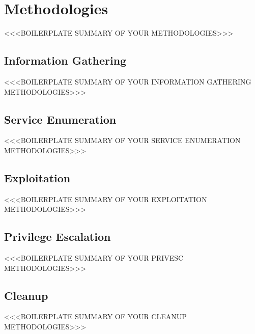 \section{Methodologies}
<<<BOILERPLATE SUMMARY OF YOUR METHODOLOGIES>>>

\subsection{Information Gathering}
<<<BOILERPLATE SUMMARY OF YOUR INFORMATION GATHERING METHODOLOGIES>>>

\subsection{Service Enumeration}
<<<BOILERPLATE SUMMARY OF YOUR SERVICE ENUMERATION METHODOLOGIES>>>

\subsection{Exploitation}
<<<BOILERPLATE SUMMARY OF YOUR EXPLOITATION METHODOLOGIES>>>

\subsection{Privilege Escalation}
<<<BOILERPLATE SUMMARY OF YOUR PRIVESC METHODOLOGIES>>>

\subsection{Cleanup}
<<<BOILERPLATE SUMMARY OF YOUR CLEANUP METHODOLOGIES>>>
